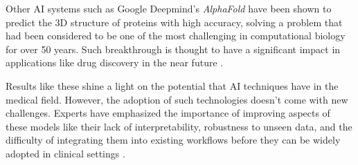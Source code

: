 \documentclass[../main.tex]{subfiles}
\begin{document}
    \clearpage

    \begin{table}[h]
   \end{table}

    Other AI systems such as Google Deepmind's \textit{AlphaFold} \cite{yang_alphafold2_2023} have been shown to predict the 3D structure of proteins with high accuracy, solving a problem that had been considered to be one of the most challenging in computational biology for over 50 years. Such breakthrough is thought to have a significant impact in applications like drug discovery in the near future \cite{jumper_highly_2021}.
    
    Results like these shine a light on the potential that AI techniques have in the medical field. However, the adoption of such technologies doesn't come with new challenges. Experts have emphasized the importance of improving aspects of these models like their lack of interpretability, robustness to unseen data, and the difficulty of integrating them into existing workflows before they can be widely adopted in clinical settings \cite{esteva_deep_2021, topol_high-performance_2019}.
    
\end{document}
